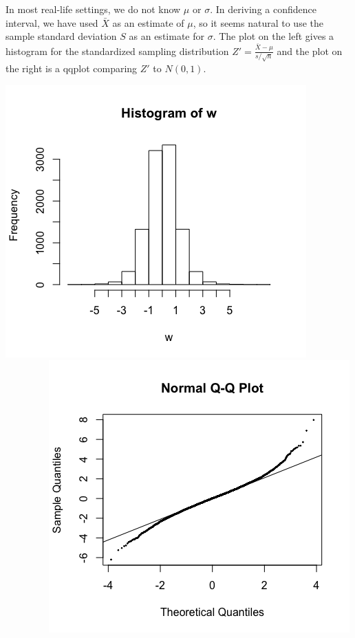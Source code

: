 \clearpage


In most real-life settings, we do not know $\mu$ or $\sigma$. In deriving a confidence interval, we have used $\bar{X}$ as an estimate of $\mu$, so it seems natural to use the sample standard deviation $S$ as an estimate for $\sigma$. The plot on the left gives a histogram for the standardized sampling distribution  $Z' = \frac{\bar{X}-\mu}{s/\sqrt{n}}$ and the plot on the right is a qqplot comparing $Z'$ to $N(0,1)$.  

\begin{center}
\includegraphics[width=0.3\tw]{16/fig-stand-samp.png} \ \ \ \ \ \ \ \ \
\includegraphics[width=0.3\tw]{16/fig-qq-samp.png}
\end{center}

